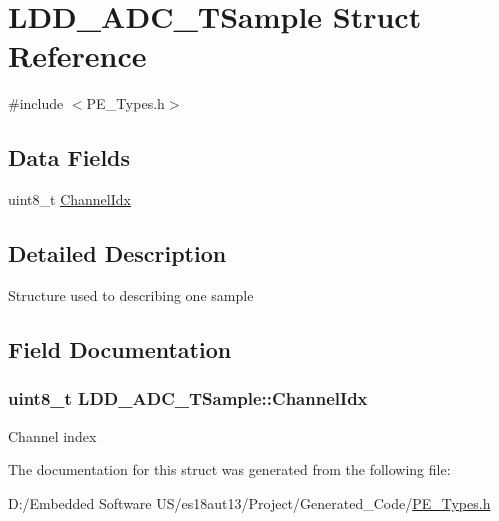 \hypertarget{struct_l_d_d___a_d_c___t_sample}{}\section{L\+D\+D\+\_\+\+A\+D\+C\+\_\+\+T\+Sample Struct Reference}
\label{struct_l_d_d___a_d_c___t_sample}


{\ttfamily \#include $<$P\+E\+\_\+\+Types.\+h$>$}

\subsection*{Data Fields}
\begin{DoxyCompactItemize}
\item 
uint8\+\_\+t \hyperlink{struct_l_d_d___a_d_c___t_sample_ae2737bdf799311a9bc9f7acf30f569c1}{Channel\+Idx}
\end{DoxyCompactItemize}


\subsection{Detailed Description}
Structure used to describing one sample 

\subsection{Field Documentation}
\hypertarget{struct_l_d_d___a_d_c___t_sample_ae2737bdf799311a9bc9f7acf30f569c1}{}
\subsubsection[{Channel\+Idx}]{\setlength{\rightskip}{0pt plus 5cm}uint8\+\_\+t L\+D\+D\+\_\+\+A\+D\+C\+\_\+\+T\+Sample\+::\+Channel\+Idx}\label{struct_l_d_d___a_d_c___t_sample_ae2737bdf799311a9bc9f7acf30f569c1}
Channel index 

The documentation for this struct was generated from the following file\+:\begin{DoxyCompactItemize}
\item 
D\+:/\+Embedded Software U\+S/es18aut13/\+Project/\+Generated\+\_\+\+Code/\hyperlink{_p_e___types_8h}{P\+E\+\_\+\+Types.\+h}\end{DoxyCompactItemize}

